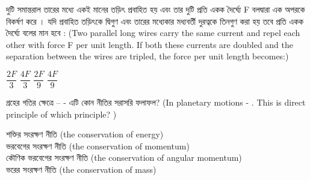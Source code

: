 \documentclass[addpoints]{exam}
\begin{document}
\begin{questions}
\question   দুটি সমান্তরাল তারের মধ্যে একই মানের তড়িৎ প্রবাহিত হয় এবং তার দুটি প্রতি একক দৈর্ঘ্যে F বলদ্বারা এক অপরকে বিকর্ষণ করে । যদি প্রবাহিত তড়িৎকে দ্বিগুণ এবং তারের মধ্যেকার মধ্যবর্তী দুরত্বকে তিনগুণ করা হয় তবে প্রতি একক দৈর্ঘ্যে বলের মান হবে : (Two parallel long wires carry the same current and repel each other with force F per unit length. If both these currents are doubled and the separation between the wires are tripled, the force per unit length becomes:)

\begin{oneparchoices}
\choice $ \dfrac{2F}{3} $
\choice $ \dfrac{4F}{3} $
\choice $ \dfrac{2F}{9} $
\choice $ \dfrac{4F}{9} $

\end{oneparchoices}

\question  গ্রহের গতির ক্ষেত্রে –  - এটি কোন নীতির সরাসরি ফলাফল? (In planetary motions - . This is direct principle of which principle? )

\begin{oneparchoices}
\choice শক্তির সংরক্ষণ নীতি (the conservation of energy)\\
\hspace*{-.3cm}\choice ভরবেগের সংরক্ষণ নীতি (the conservation of momentum) \\
\hspace*{-.3cm}\choice কৌণিক ভরবেগের সংরক্ষণ নীতি (the conservation of angular momentum)\\
\hspace*{-.3cm}\choice ভরের সংরক্ষণ নীতি (the conservation of mass)
\end{oneparchoices}

\end{questions}
\end{document}
